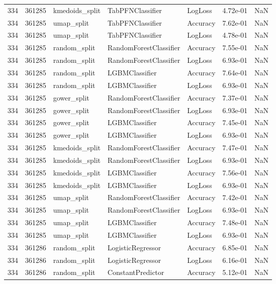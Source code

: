 \begin{tabular}{rrlllrr}
334 & 361285 & kmedoids\_split & TabPFNClassifier & LogLoss & 4.72e-01 & NaN \\
334 & 361285 & umap\_split & TabPFNClassifier & Accuracy & 7.62e-01 & NaN \\
334 & 361285 & umap\_split & TabPFNClassifier & LogLoss & 4.78e-01 & NaN \\
334 & 361285 & random\_split & RandomForestClassifier & Accuracy & 7.55e-01 & NaN \\
334 & 361285 & random\_split & RandomForestClassifier & LogLoss & 6.93e-01 & NaN \\
334 & 361285 & random\_split & LGBMClassifier & Accuracy & 7.64e-01 & NaN \\
334 & 361285 & random\_split & LGBMClassifier & LogLoss & 6.93e-01 & NaN \\
334 & 361285 & gower\_split & RandomForestClassifier & Accuracy & 7.37e-01 & NaN \\
334 & 361285 & gower\_split & RandomForestClassifier & LogLoss & 6.93e-01 & NaN \\
334 & 361285 & gower\_split & LGBMClassifier & Accuracy & 7.45e-01 & NaN \\
334 & 361285 & gower\_split & LGBMClassifier & LogLoss & 6.93e-01 & NaN \\
334 & 361285 & kmedoids\_split & RandomForestClassifier & Accuracy & 7.47e-01 & NaN \\
334 & 361285 & kmedoids\_split & RandomForestClassifier & LogLoss & 6.93e-01 & NaN \\
334 & 361285 & kmedoids\_split & LGBMClassifier & Accuracy & 7.56e-01 & NaN \\
334 & 361285 & kmedoids\_split & LGBMClassifier & LogLoss & 6.93e-01 & NaN \\
334 & 361285 & umap\_split & RandomForestClassifier & Accuracy & 7.42e-01 & NaN \\
334 & 361285 & umap\_split & RandomForestClassifier & LogLoss & 6.93e-01 & NaN \\
334 & 361285 & umap\_split & LGBMClassifier & Accuracy & 7.48e-01 & NaN \\
334 & 361285 & umap\_split & LGBMClassifier & LogLoss & 6.93e-01 & NaN \\
334 & 361286 & random\_split & LogisticRegressor & Accuracy & 6.85e-01 & NaN \\
334 & 361286 & random\_split & LogisticRegressor & LogLoss & 6.16e-01 & NaN \\
334 & 361286 & random\_split & ConstantPredictor & Accuracy & 5.12e-01 & NaN \\

\end{tabular}
